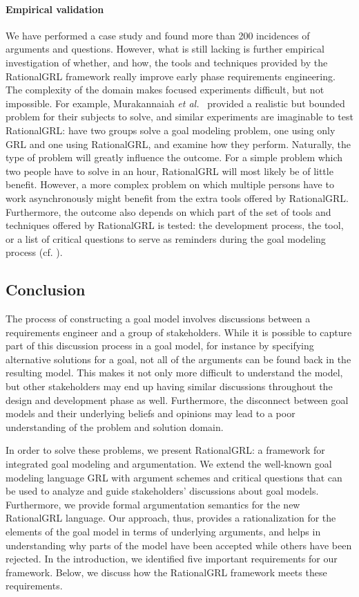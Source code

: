 \paragraph{Empirical validation}
We have performed a case study and found more than 200 incidences of arguments and questions. However, what is still lacking is further empirical investigation of whether, and how, the tools and techniques provided by the RationalGRL framework really improve early phase requirements engineering. The complexity of the domain makes focused experiments difficult, but not impossible. For example, Murakannaiah \emph{et al.}~\cite{murukannaiah2015} provided a realistic but bounded problem for their subjects to solve, and similar experiments are imaginable to test RationalGRL: have two groups solve a goal modeling problem, one using only GRL and one using RationalGRL, and examine how they perform. Naturally, the type of problem will greatly influence the outcome. For a simple problem which two people have to solve in an hour, RationalGRL will most likely be of little benefit. However, a more complex problem on which multiple persons have to work asynchronously might benefit from the extra tools offered by RationalGRL. Furthermore, the outcome also depends on which part of the set of tools and techniques offered by RationalGRL is tested: the development process, the tool, or a list of critical questions to serve as reminders during the goal modeling process (cf. \cite{SchriekEtal2016}).

\subsection{Conclusion}
\label{sect:discussion:conclusion}

The process of constructing a goal model involves discussions between a requirements engineer and a group of stakeholders. While it is possible to capture part of this discussion process in a goal model, for instance by specifying alternative solutions for a goal, not all of the arguments can be found back in the resulting model. This makes it not only more difficult to understand the model, but other stakeholders may end up having similar discussions throughout the design and development phase as well. Furthermore, the disconnect between goal models and their underlying beliefs and opinions may lead to a poor understanding of the problem and solution domain. 

In order to solve these problems, we present RationalGRL: a framework for integrated goal modeling and argumentation. We extend the well-known goal modeling language GRL with argument schemes and critical questions that can be used to analyze and guide stakeholders' discussions about goal models. Furthermore, we provide formal argumentation semantics for the new RationalGRL language. Our approach, thus, provides a rationalization for the elements of the goal model in terms of underlying arguments, and helps in understanding why parts of the model have been accepted while others have been rejected. In the introduction, we identified five important requirements for our framework. Below, we discuss how the RationalGRL framework meets these requirements.

